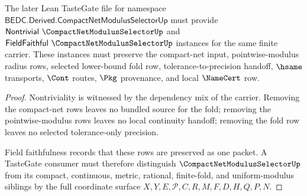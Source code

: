 \begin{theorem}
\label{thm:compact-net-modulus-selector-tastegate-obligation}
The later Lean TasteGate file for namespace $\mathsf{BEDC.Derived.CompactNetModulusSelectorUp}$ must provide $\mathsf{Nontrivial}\ \CompactNetModulusSelectorUp$ and $\mathsf{FieldFaithful}\ \CompactNetModulusSelectorUp$ instances for the same finite carrier. These instances must preserve the compact-net input, pointwise-modulus radius rows, selected lower-bound fold row, tolerance-to-precision handoff, $\hsame$ transports, $\Cont$ routes, $\Pkg$ provenance, and local $\NameCert$ row.
\end{theorem}

\begin{proof}
Nontriviality is witnessed by the dependency mix of the carrier. Removing the compact-net rows leaves no bundled source for the fold; removing the pointwise-modulus rows leaves no local continuity handoff; removing the fold row leaves no selected tolerance-only precision.

Field faithfulness records that these rows are preserved as one packet. A TasteGate consumer must therefore distinguish $\CompactNetModulusSelectorUp$ from its compact, continuous, metric, rational, finite-fold, and uniform-modulus siblings by the full coordinate surface $X,Y,E,\mathcal{P},C,R,M,F,D,H,Q,P,N$.
\end{proof}

